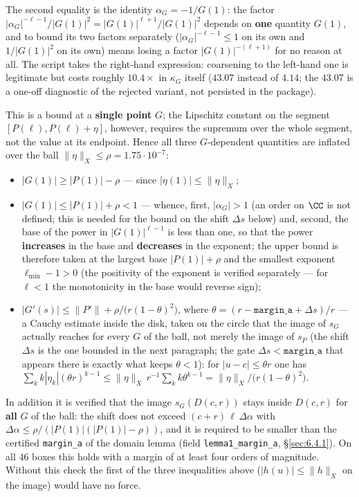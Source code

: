 The second equality is the identity $\alpha_G=-1/G(1)$: the factor
$|\alpha_G|^{-\ell-1}/|G(1)|^{2}=|G(1)|^{\ell+1}/|G(1)|^{2}$ depends on
\textbf{one} quantity $G(1)$, and to bound its two factors separately
($|\alpha_G|^{-\ell-1}\le1$ on its own and $1/|G(1)|^{2}$ on its own) means
losing a factor $|G(1)|^{-(\ell+1)}$ for no reason at all. The script takes
the right-hand expression: coarsening to the left-hand one is legitimate but
costs roughly $10.4\times$ in $\kappa_G$ itself ($43.07$ instead of $4.14$; the
$43.07$ is a one-off diagnostic of the rejected variant, not persisted in the
package).

This is a bound at a \textbf{single point} $G$; the Lipschitz constant on the
segment $[P(\ell),P(\ell)+\eta]$, however, requires the supremum over the
whole segment, not the value at its endpoint. Hence all three $G$-dependent
quantities are inflated over the ball $\|\eta\|_X\le\rho=1.75\cdot10^{-7}$:

\begin{itemize}
\item $|G(1)|\ge|P(1)|-\rho$ --- since $|\eta(1)|\le\|\eta\|_X$;
\item $|G(1)|\le|P(1)|+\rho<1$ --- whence, first, $|\alpha_G|>1$ (an order on
  $\CC$ is not defined; this is needed for the bound on the shift
  $\Delta s$ below) and, second, the base of the power in $|G(1)|^{\ell-1}$
  is less than one, so that the power \textbf{increases} in the base and
  \textbf{decreases} in the exponent; the upper bound is therefore taken at
  the largest base $|P(1)|+\rho$ and the smallest exponent $\ell_{\min}-1>0$
  (the positivity of the exponent is verified separately --- for $\ell<1$
  the monotonicity in the base would reverse sign);
\item $|G'(s)|\le\|P'\|+\rho/\bigl(r(1-\theta)^2\bigr)$, where
  $\theta=(r-\mathtt{margin\_a}+\Delta s)/r$ --- a Cauchy estimate inside the disk, taken on the circle that the image of $s_{G}$ actually reaches for every $G$ of the ball, not merely the image of $s_{P}$ (the shift $\Delta s$ is the one bounded in the next paragraph; the gate $\Delta s<\mathtt{margin\_a}$ that appears there is exactly what keeps $\theta<1$):
  for $|u-c|\le\theta r$ one has
  $\sum_k k|\eta_k|(\theta r)^{k-1}\le\|\eta\|_X\,r^{-1}\sum_k k\theta^{k-1}
  =\|\eta\|_X/\bigl(r(1-\theta)^2\bigr)$.
\end{itemize}

In addition it is verified that the image $s_G(D(c,r))$ stays inside
$D(c,r)$ for \textbf{all} $G$ of the ball: the shift does not exceed
$(c+r)\,\ell\,\Delta\alpha$ with $\Delta\alpha\le\rho/(|P(1)|(|P(1)|-\rho))$,
and it is required to be smaller than the certified \texttt{margin\_a} of
the domain lemma (field \texttt{lemma1\_\allowbreak margin\_\allowbreak a}, \S\ref{sec:6.4.1}). On all 46 boxes this
holds with a margin of at least four orders of magnitude. Without this check
the first of the three inequalities above ($|h(u)|\le\|h\|_X$ on the image)
would have no force.

